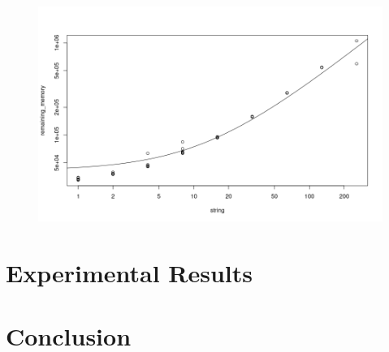 \documentclass{article}
\begin{document}
\begin{figure}
  \centering
  \includegraphics[width=\textwidth]{../proof_of_concept/prediction2.png}
  \caption{}
  \label{}
\end{figure}

\section{Experimental Results}

\section{Conclusion}
\end{document}
